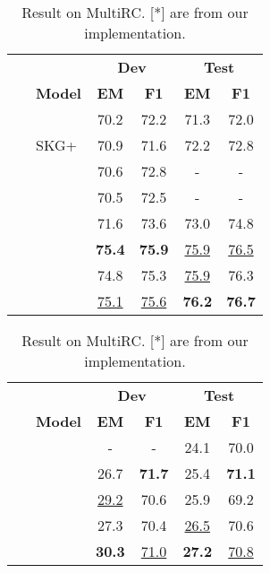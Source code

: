 \documentclass{article} \usepackage{iclr2022_conference,times}
\begin{document}
\begin{table}[!ht]
\begin{minipage}{0.48\linewidth}

\centering
\scriptsize
\setlength{\tabcolsep}{1.0mm}
 \begin{tabular}{clcccc}
  \toprule
    \multicolumn{2}{c}{} & \multicolumn{2}{c}{\textbf{Dev}} & \multicolumn{2}{c}{\textbf{Test}}  \\
  	&	\textbf{Model} & \textbf{EM}	&	\textbf{F1} &	\textbf{EM}	&	\textbf{F1} \\
  \midrule
~	&		&	70.2	&	72.2	&	71.3	&	72.0	\\
\midrule															
~	&	SKG+	&	70.9	&	71.6	&	72.2	&	72.8	\\
    ~	&		&	70.6	&	72.8	&	-	&	-	\\
    ~	&		&	70.5	&	72.5	&	-	&	-	\\
    ~	&		&	71.6	&	73.6	&	73.0	&	74.8	\\
    \midrule	
    
~	&		&	\textbf{75.4}	&	\textbf{75.9}	&	\underline{75.9}	&	\underline{76.5}	\\
~	&		&	74.8	&	75.3	&	\underline{75.9}	&	76.3	\\
    ~	&		&	\underline{75.1}	&	\underline{75.6}	&	\textbf{76.2}	&	\textbf{76.7}	\\
\bottomrule
\end{tabular}
\caption{Result on ReCoRD.}
\label{main results table extractive}

\end{minipage}\begin{minipage}{0.48\linewidth}  


\setlength{\belowcaptionskip}{-5mm}
\centering
\scriptsize
\setlength{\tabcolsep}{1.0mm}
 \begin{tabular}{clcccc}
  \toprule
    \multicolumn{2}{c}{} & \multicolumn{2}{c}{\textbf{Dev}} & \multicolumn{2}{c}{\textbf{Test}}  \\
  	&	\textbf{Model} & \textbf{EM}	&	\textbf{F1} &	\textbf{EM}	&	\textbf{F1} \\
\midrule
~	&		&	-	&	-	&	24.1	&	70.0	\\
\midrule															
~	&		&	26.7	&	\textbf{71.7}	&	25.4 & \textbf{71.1}	\\
    \midrule	
    
~	&		&	\underline{29.2}	&	70.6	&	25.9	&	69.2	\\
~	&		&	27.3	&	70.4	&	\underline{26.5}	&	70.6	\\
~	&		&	\textbf{30.3}	&	\underline{71.0}	&	\textbf{27.2}	&	\underline{70.8}	\\

\bottomrule
\end{tabular}
\caption{Result on MultiRC. [*] are from our implementation.}
\label{main results table multiple}
\end{minipage}

\end{table}
\end{document}
